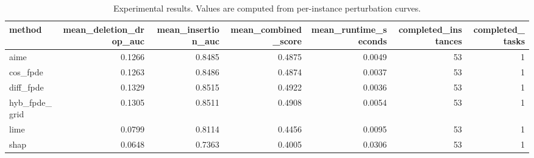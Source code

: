 \begin{table}[t]
\caption{Experimental results. Values are computed from per-instance perturbation curves.}
\label{tab:main_results_computed}
\centering
\begin{tabular}{lrrrrrr}
\toprule
method & mean\_deletion\_drop\_auc & mean\_insertion\_auc & mean\_combined\_score & mean\_runtime\_seconds & completed\_instances & completed\_tasks \\
\midrule
aime & 0.1266 & 0.8485 & 0.4875 & 0.0049 & 53 & 1 \\
cos\_fpde & 0.1263 & 0.8486 & 0.4874 & 0.0037 & 53 & 1 \\
diff\_fpde & 0.1329 & 0.8515 & 0.4922 & 0.0036 & 53 & 1 \\
hyb\_fpde\_grid & 0.1305 & 0.8511 & 0.4908 & 0.0054 & 53 & 1 \\
lime & 0.0799 & 0.8114 & 0.4456 & 0.0095 & 53 & 1 \\
shap & 0.0648 & 0.7363 & 0.4005 & 0.0306 & 53 & 1 \\
\bottomrule
\end{tabular}

\end{table}
